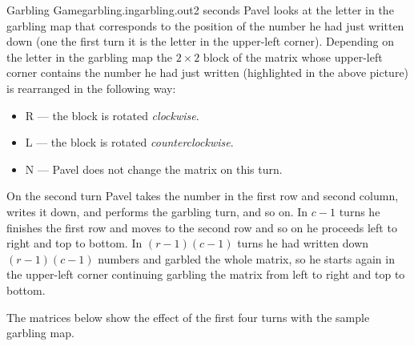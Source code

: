 \begin{problem}{Garbling Game}{garbling.in}{garbling.out}{2 seconds}
Pavel looks at the letter in the garbling map that corresponds to the position of the number he had
just written down (one the first turn it is the letter in the upper-left corner). Depending on
the letter in the garbling map the $2 \times 2$ block of the matrix whose upper-left corner
contains the number he had just written (highlighted in the above picture) is rearranged in the
following way:

\begin{itemize}
\item{R} --- the block is rotated \emph{clockwise}.
\item{L} --- the block is rotated \emph{counterclockwise}.
\item{N} --- Pavel does not change the matrix on this turn.
\end{itemize}

On the second turn Pavel takes the number in the first row and second column, writes it down, and performs
the garbling turn, and so on. In $c-1$ turns he finishes the first row and moves to the second row and so on
he proceeds left to right and top to bottom. In $(r-1)(c-1)$ turns he had written down $(r-1)(c-1)$ numbers and
garbled the whole matrix, so he starts again in the upper-left corner continuing garbling the matrix from left
to right and top to bottom.

The matrices below show the effect of the first four turns with the sample garbling map.


\end{problem}
